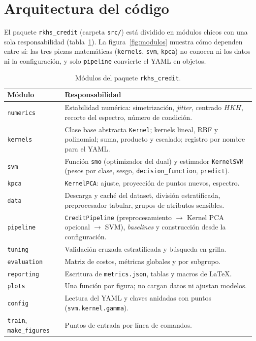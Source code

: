 \documentclass[11pt,a4paper]{article}
\newcommand{\code}[1]{\texttt{#1}}
\theoremstyle{plain}
\theoremstyle{definition}
\theoremstyle{remark}
\numberwithin{equation}{section}
\begin{document}
\section{Arquitectura del código}

El paquete \code{rkhs\_credit} (carpeta \code{src/}) está dividido en módulos chicos con una
sola responsabilidad (tabla~\ref{tab:modulos}). La figura~\ref{fig:modulos} muestra cómo
dependen entre sí: las tres piezas matemáticas (\code{kernels}, \code{svm}, \code{kpca}) no
conocen ni los datos ni la configuración, y solo \code{pipeline} convierte el YAML en objetos.

\begin{table}[H]
  \centering
  \small
  \begin{tabular}{@{}lp{}@{}}
    \toprule
    Módulo & Responsabilidad \\
    \midrule
    \code{numerics}   & Estabilidad numérica: simetrización, \emph{jitter}, centrado $HKH$,
                        recorte del espectro, número de condición. \\
    \code{kernels}    & Clase base abstracta \code{Kernel}; kernels lineal, RBF y polinomial;
                        suma, producto y escalado; registro por nombre para el YAML. \\
    \code{svm}        & Función \code{smo} (optimizador del dual) y estimador \code{KernelSVM}
                        (pesos por clase, sesgo, \code{decision\_function}, \code{predict}). \\
    \code{kpca}       & \code{KernelPCA}: ajuste, proyección de puntos nuevos, espectro. \\
    \code{data}       & Descarga y caché del dataset, división estratificada,
                        preprocesador tabular, grupos de atributos sensibles. \\
    \code{pipeline}   & \code{CreditPipeline} (preprocesamiento $\to$ Kernel PCA opcional
                        $\to$ SVM), \emph{baselines} y construcción desde la configuración. \\
    \code{tuning}     & Validación cruzada estratificada y búsqueda en grilla. \\
    \code{evaluation} & Matriz de costos, métricas globales y por subgrupo. \\
    \code{reporting}  & Escritura de \code{metrics.json}, tablas y macros de \LaTeX. \\
    \code{plots}      & Una función por figura; no cargan datos ni ajustan modelos. \\
    \code{config}     & Lectura del YAML y claves anidadas con puntos
                        (\code{svm.kernel.gamma}). \\
    \code{train}, \code{make\_figures} & Puntos de entrada por línea de comandos. \\
    \bottomrule
  \end{tabular}
  \caption{Módulos del paquete \code{rkhs\_credit}.}
  \label{tab:modulos}
\end{table}
\end{document}
